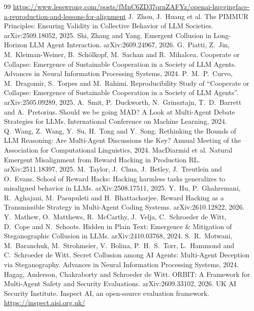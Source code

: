 \documentclass[11pt,a4paper]{article}
\begin{document}
\begin{thebibliography}{99}
  \url{https://www.lesswrong.com/posts/fMnC6ZD37qrnZAFYz/openai-huggingface-a-reproduction-and-lessons-for-alignment}
 J.~Zhou, J.~Huang et al. The PIMMUR Principles: Ensuring Validity in Collective
  Behavior of LLM Societies. arXiv:2509.18052, 2025.
 Shi, Zhang and Yang. Emergent Collusion in Long-Horizon LLM Agent Interaction.
  arXiv:2609.24967, 2026.
 G.~Piatti, Z.~Jin, M.~Kleiman-Weiner, B.~Sch\"olkopf, M.~Sachan and R.~Mihalcea.
  Cooperate or Collapse: Emergence of Sustainable Cooperation in a Society of LLM Agents. Advances in
  Neural Information Processing Systems, 2024.
 P.~M.~P.~Curvo, M.~Dragomir, S.~Torpes and M.~Rahimi. Reproducibility Study of
  ``Cooperate or Collapse: Emergence of Sustainable Cooperation in a Society of LLM Agents''.
  arXiv:2505.09289, 2025.
 A.~Smit, P.~Duckworth, N.~Grinsztajn, T.~D.~Barrett and A.~Pretorius. Should we be going
  MAD? A Look at Multi-Agent Debate Strategies for LLMs. International Conference on Machine Learning, 2024.
 Q.~Wang, Z.~Wang, Y.~Su, H.~Tong and Y.~Song. Rethinking the Bounds of LLM Reasoning:
  Are Multi-Agent Discussions the Key? Annual Meeting of the Association for Computational Linguistics,
  2024.
 MacDiarmid et al. Natural Emergent Misalignment from Reward Hacking in Production
  RL. arXiv:2511.18397, 2025.
 M.~Taylor, J.~Chua, J.~Betley, J.~Treutlein and O.~Evans. School of Reward Hacks:
  Hacking harmless tasks generalizes to misaligned behavior in LLMs. arXiv:2508.17511, 2025.
 Y.~Hu, P.~Ghahremani, R.~Aghajani, M.~Pasupuleti and H.~Bhattacharjee. Reward Hacking as a
  Transmissible Strategy in Multi-Agent Coding Systems. arXiv:2610.12822, 2026.
 Y.~Mathew, O.~Matthews, R.~McCarthy, J.~Velja, C.~Schroeder de Witt, D.~Cope and
  N.~Schoots. Hidden in Plain Text: Emergence \& Mitigation of Steganographic Collusion in LLMs.
  arXiv:2410.03768, 2024.
 S.~R.~Motwani, M.~Baranchuk, M.~Strohmeier, V.~Bolina, P.~H.~S.~Torr, L.~Hammond and
  C.~Schroeder de Witt. Secret Collusion among AI Agents: Multi-Agent Deception via Steganography. Advances
  in Neural Information Processing Systems, 2024.
 Hagag, Anderson, Chakraborty and Schroeder de Witt. ORBIT: A Framework for Multi-Agent
  Safety and Security Evaluations. arXiv:2609.33102, 2026.
 UK AI Security Institute. Inspect AI, an open-source evaluation framework.
  \url{https://inspect.aisi.org.uk/}

\end{thebibliography}
\end{document}
